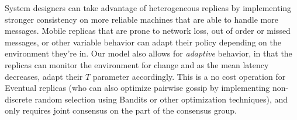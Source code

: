 System designers can take advantage of heterogeneous replicas by implementing
stronger consistency on more reliable machines that are able to handle more
messages.
Mobile replicas that are prone to network loss, out of order or missed
messages, or other variable behavior can adapt their policy depending on the
environment they're in.
Our model also allows for \textit{adaptive} behavior, in that the replicas can
monitor the environment for change and as the mean latency decreases, adapt
their $T$ parameter accordingly.
This is a no cost operation for Eventual replicas (who can also optimize
pairwise gossip by implementing non-discrete random selection using Bandits or
other optimization techniques), and only requires joint consensus on the part
of the consensus group.
